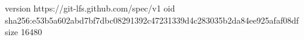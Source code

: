 version https://git-lfs.github.com/spec/v1
oid sha256:e53b5a602abd7bf7dbc08291392c47231339d4c283035b2da84ee925afaf08df
size 16480
